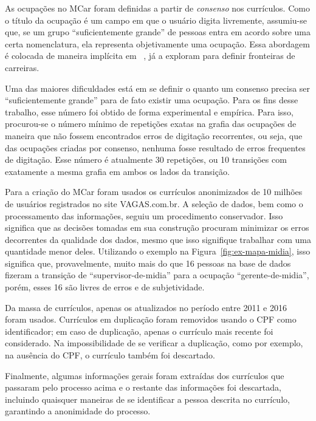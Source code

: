 \documentclass[
  article,
  11pt,
  a4paper,
  english,
  brazil,
  sumario=tradicional]{abntex2}
\begin{document}
As ocupações no MCar foram definidas a partir de \textit{consenso} nos currículos. Como o título da ocupação é um campo em que o usuário digita livremente, assumiu-se que, se um grupo \enquote{suficientemente grande} de pessoas entra em acordo sobre uma certa nomenclatura, ela representa objetivamente uma ocupação. Essa abordagem é colocada de maneira implícita em ~, já  a exploram para definir fronteiras de carreiras.

Uma das maiores dificuldades está em se definir o quanto um consenso precisa ser \enquote{suficientemente grande} para de fato existir uma ocupação. Para os fins desse trabalho, esse número foi obtido de forma experimental e empírica. Para isso, procurou-se o número mínimo de repetições exatas na grafia das ocupações de maneira que não fossem encontrados erros de digitação recorrentes, ou seja, que das ocupações criadas por consenso, nenhuma fosse resultado de erros frequentes de digitação. Esse número é atualmente 30 repetições, ou 10 transições com exatamente a mesma grafia em ambos os lados da transição.

Para a criação do MCar foram usados os currículos anonimizados de 10 milhões de usuários registrados no site VAGAS.com.br. A seleção de dados, bem como o processamento das informações, seguiu um procedimento conservador. Isso significa que as decisões tomadas em sua construção procuram minimizar os erros decorrentes da qualidade dos dados, mesmo que isso signifique trabalhar com uma quantidade menor deles. Utilizando o exemplo na Figura~\ref{fig:ex-mapa-midia}, isso significa que, provavelmente, muito mais do que 16 pessoas na base de dados fizeram a transição de \enquote{supervisor-de-midia} para a ocupação \enquote{gerente-de-midia}, porém, esses 16 são livres de erros e de subjetividade.

Da massa de currículos, apenas os atualizados no período entre 2011 e 2016 foram usados. Currículos em duplicação foram removidos usando o CPF como identificador; em caso de duplicação, apenas o currículo mais recente foi considerado. Na impossibilidade de se verificar a duplicação, como por exemplo, na ausência do CPF, o currículo também foi descartado.

Finalmente, algumas informações gerais foram extraídas dos currículos que passaram pelo processo acima e o restante das informações foi descartada, incluindo quaisquer maneiras de se identificar a pessoa descrita no currículo, garantindo a anonimidade do processo.
\end{document}
